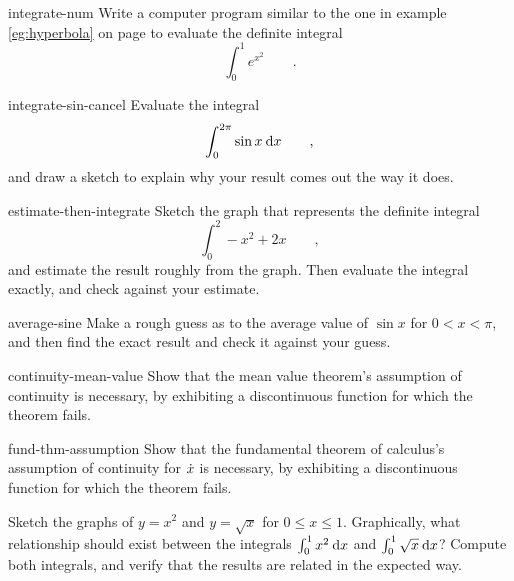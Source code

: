 \begin{hwsection}
\begin{hwwithsoln}{integrate-num}
Write a computer program similar to the one in example \ref{eg:hyperbola} on page \pageref{eg:hyperbola}
to evaluate the definite integral
\begin{equation*}
  \int_0^1 e^{x^2} \qquad .
\end{equation*}
\end{hwwithsoln}

\begin{hwwithsoln}{integrate-sin-cancel}
Evaluate the integral
\begin{equation*}
  \int_0^{2\pi} \sin x \:\textup{d} x \qquad ,
\end{equation*}
and draw a sketch to explain why your result comes out the way it does.
\end{hwwithsoln}

\begin{hwwithsoln}{estimate-then-integrate}
Sketch the graph that represents the definite integral
\begin{equation*}
  \int_0^2 -x^2+2x \qquad ,
\end{equation*}
and estimate the result roughly from the graph. Then evaluate the
integral exactly, and check against your estimate.
\end{hwwithsoln}

\begin{hwwithsoln}{average-sine}
Make a rough guess as to the average value of $\sin x$ for $0<x<\pi$, and then
find the exact result and check it against your guess.
\end{hwwithsoln}

\begin{hwwithsoln}{continuity-mean-value}
Show that the mean value theorem's assumption of continuity is necessary, by exhibiting
a discontinuous function for which the theorem fails.
\end{hwwithsoln}

\begin{hwwithsoln}{fund-thm-assumption}
Show that the fundamental theorem of calculus's assumption of continuity for $\dot{x}$ is necessary, by exhibiting
a discontinuous function for which the theorem fails.
\end{hwwithsoln}

\begin{hw}
Sketch the graphs of $y=x^2$ and $y=\sqrt{x}$ for $0\le x\le 1$. Graphically, what relationship
should exist between the integrals $\int_0^1 x^2\:\textup{d} x$ and $\int_0^1 \sqrt{x}\:\textup{d} x$? Compute both
integrals, and verify that the results are related in the expected way.
\end{hw}


\end{hwsection}
